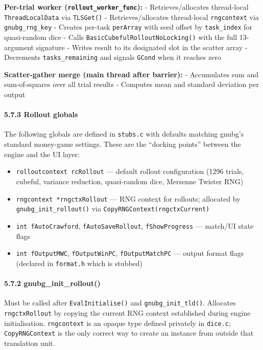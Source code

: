 \documentclass[11pt,a4paper]{article}
\providecommand{\tightlist}{\setlength{\itemsep}{2pt}\setlength{\parskip}{0pt}}
\begin{document}
\textbf{Per-trial worker (\texttt{rollout\_worker\_func}):} -
Retrieves/allocates thread-local \texttt{ThreadLocalData} via
\texttt{TLSGet()} - Retrieves/allocates thread-local \texttt{rngcontext}
via \texttt{gnubg\_rng\_key} - Creates per-task \texttt{perArray} with
seed offset by \texttt{task\_index} for quasi-random dice - Calls
\texttt{BasicCubefulRolloutNoLocking()} with the full 13-argument
signature - Writes result to its designated slot in the scatter array -
Decrements \texttt{tasks\_remaining} and signals \texttt{GCond} when it
reaches zero

\textbf{Scatter-gather merge (main thread after barrier):} - Accumulates
sum and sum-of-squares over all trial results - Computes mean and
standard deviation per output

\paragraph{5.7.3 Rollout globals}\label{rollout-globals}

The following globals are defined in \texttt{stubs.c} with defaults
matching gnubg's standard money-game settings. These are the ``docking
points'' between the engine and the UI layer:

\begin{itemize}
\tightlist
\item
  \texttt{rolloutcontext\ rcRollout} --- default rollout configuration
  (1296 trials, cubeful, variance reduction, quasi-random dice, Mersenne
  Twister RNG)
\item
  \texttt{rngcontext\ *rngctxRollout} --- RNG context for rollouts;
  allocated by \texttt{gnubg\_init\_rollout()} via
  \texttt{CopyRNGContext(rngctxCurrent)}
\item
  \texttt{int\ fAutoCrawford}, \texttt{fAutoSaveRollout},
  \texttt{fShowProgress} --- match/UI state flags
\item
  \texttt{int\ fOutputMWC}, \texttt{fOutputWinPC},
  \texttt{fOutputMatchPC} --- output format flags (declared in
  \texttt{format.h} which is stubbed)
\end{itemize}

\paragraph{5.7.2 gnubg\_init\_rollout()}\label{gnubg_init_rollout}

Must be called after \texttt{EvalInitialise()} and
\texttt{gnubg\_init\_tld()}. Allocates \texttt{rngctxRollout} by copying
the current RNG context established during engine initialisation.
\texttt{rngcontext} is an opaque type defined privately in
\texttt{dice.c}; \texttt{CopyRNGContext} is the only correct way to
create an instance from outside that translation unit.
\end{document}
